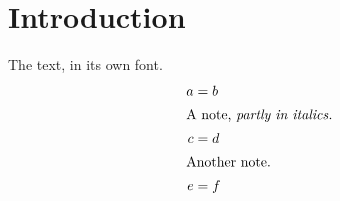 \documentclass{article}
\begin{document}
\tableofcontents
\section{Introduction}
The text, in its own font.
\begin{align*}
    a &= b \\
    \intertext{A note, \itshape partly in italics.}
    c &= d \\
    \intertext{Another note.}
    e &= f
\end{align*}
\end{document}
